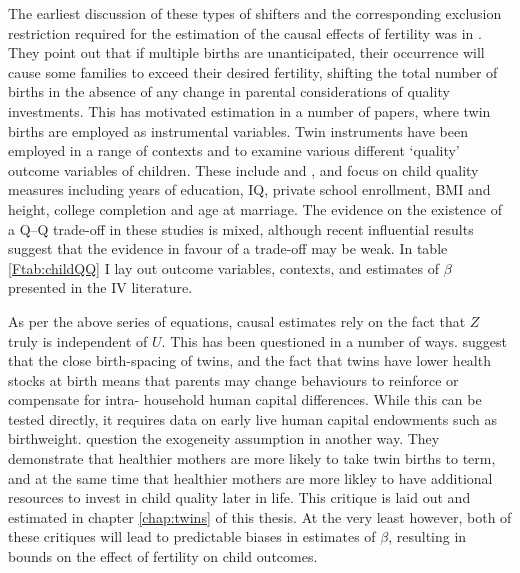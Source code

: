 The earliest discussion of these types of shifters and the corresponding 
exclusion restriction required for the estimation of the causal effects of 
fertility was in \citet{RosenzweigWolpin1980}. They point out that if multiple 
births are unanticipated, their occurrence will cause some families to exceed 
their desired fertility, shifting the total number of births in the absence of 
any change in parental considerations of quality investments. This has motivated 
estimation in a number of papers, where twin births are employed as instrumental 
variables.  Twin instruments have been employed in a range of contexts and
to examine various different `quality' outcome variables of children. These 
include \citet{Blacketal2005,Caceres2006,Lietal2008,Dayiogluetal2009,Sanhueza2009,
Blacketal2010,Angristetal2010,FitzsimonsMalde2010} and \citet{SouzaPonczek2012}, 
and focus on child quality measures including years of education, IQ, private 
school enrollment, BMI and height, college completion and age at marriage.  The 
evidence on the existence of a Q--Q trade-off in these studies is mixed, 
although recent influential results suggest that the evidence in favour of a 
trade-off may be weak.  In table \ref{Ftab:childQQ} I lay out outcome variables, 
contexts, and estimates of $\beta$ presented in the IV literature.

As per the above series of equations, causal estimates rely on the fact that
$Z$ truly is independent of $U$.  This has been questioned in a number of ways.
\citet{RosenzweigZhang2009} suggest that the close birth-spacing of twins, and 
the fact that twins have lower health stocks at birth \citep{Almondetal2005}
means that parents may change behaviours to reinforce or compensate for intra-%
household human capital differences.  While this can be tested directly, it 
requires data on early live human capital endowments such as birthweight.  
\citet{BhalotraClarke2015} question the exogeneity assumption in another way.
They demonstrate that healthier mothers are more likely to take twin births
to term, and at the same time that healthier mothers are more likley to have
additional resources to invest in child quality later in life.  This critique is
laid out and estimated in chapter \ref{chap:twins} of this thesis.  At the very
least however, both of these critiques will lead to predictable biases in 
estimates of $\beta$, resulting in bounds on the effect of fertility on child
outcomes.

